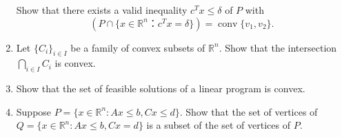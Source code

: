 \documentclass[11pt]{article}
\DeclareMathOperator{\conv}{conv}
\newcommand{\setR}{\mathbb{R}}
\renewcommand{\leq}{\leqslant}
\begin{document}
\begin{enumerate}[1)]
Show that there exists a valid inequality $c^Tx ≤ δ$ of $P$ with
\begin{displaymath}
 \left( P ∩ \{ x ∈ ℝ^n ： c^Tx = δ \} \right) = \conv\{v_1,v_2\}. 
\end{displaymath}



\begin{solution}

\end{solution}

\item Let $\{C_i\}_{i\in I}$ be a family of convex subsets of $\setR^n$.
  Show that the intersection $\bigcap_{i\in I} C_i$ is convex.
\item Show that the set of feasible solutions  of a linear program  is
  convex. \label{conv:item:1}
  
  \item Suppose $P= \{x\in\setR^n : Ax\leq b,Cx\leq d\}$. Show that the set of vertices of
$Q= \{x\in\setR^n : Ax\leq b,Cx= d\}$ is a subset of the set of vertices of $P$.



\end{enumerate}



  
\end{document}
